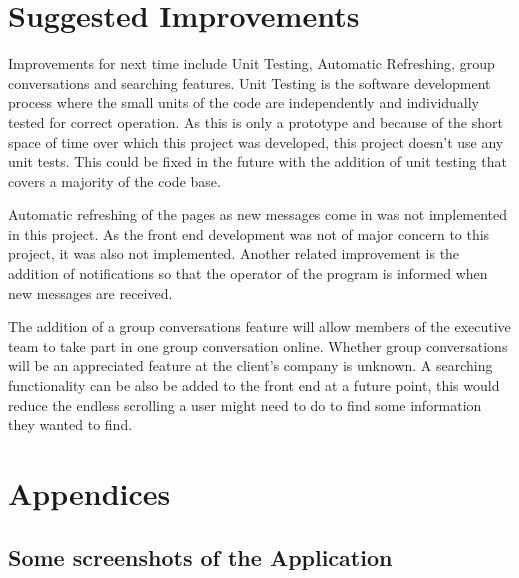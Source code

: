 \documentclass[a4paper,10pt,twoside]{article}
\begin{document}
\section{Suggested Improvements}

Improvements for next time include Unit Testing, Automatic Refreshing, group conversations and searching features. Unit Testing is the software development process where the small units of the code are independently and individually tested for correct operation. As this is only a prototype and because of the short space of time over which this project was developed, this project doesn't use any unit tests. This could be fixed in the future with the addition of unit testing that covers a majority of the code base. 

Automatic refreshing of the pages as new messages come in was not implemented in this project. As the front end development was not of major concern to this project, it was also not implemented. Another related improvement is the addition of notifications so that the operator of the program is informed when new messages are received.

The addition of a group conversations feature will allow members of the executive team to take part in one group conversation online. Whether group conversations will be an appreciated feature at the client's company is unknown. A searching functionality can be also be added to the front end at a future point, this would reduce the endless scrolling a user might need to do to find some information they wanted to find.

\section*{Appendices}

\subsection*{Some screenshots of the Application}
\end{document}
